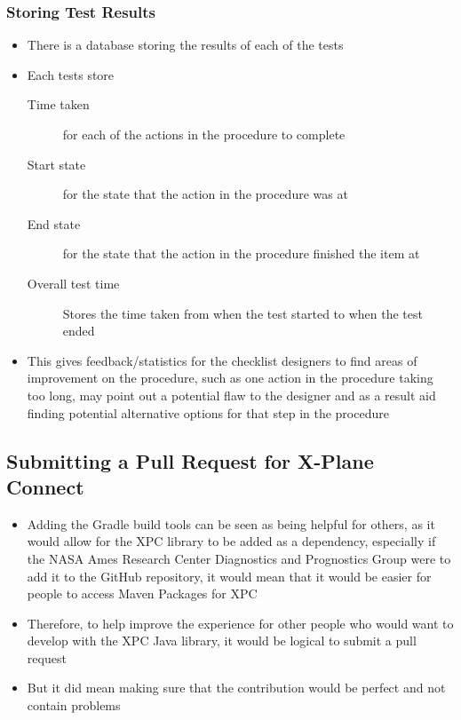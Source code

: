 \documentclass[../dissertation.tex]{subfiles}
\begin{document}
\subsubsection{Storing Test Results}
\begin{itemize}
  \item There is a database storing the results of each of the tests
  \item Each tests store
  \begin{description}
    \item[Time taken] for each of the actions in the procedure to complete
    \item[Start state] for the state that the action in the procedure was at
    \item[End state] for the state that the action in the procedure finished
      the item at
    \item[Overall test time] Stores the time taken from when the test started
      to when the test ended
  \end{description}
  \item This gives feedback/statistics for the checklist designers
    to find areas of improvement on the procedure, such as one action
    in the procedure taking too long, may point out a potential flaw
    to the designer and as a result aid finding potential alternative
    options for that step in the procedure
\end{itemize}

\subsection{Submitting a Pull Request for X-Plane Connect}
\begin{itemize}
  \item Adding the Gradle build tools can be seen as being helpful
    for others, as it would allow for the XPC library to be added
    as a dependency, especially if the NASA Ames Research Center Diagnostics and Prognostics Group
    were to add it to the GitHub repository, it would mean that it would be easier for
    people to access Maven Packages for XPC
  \item Therefore, to help improve the experience for other people who would want
    to develop with the XPC Java library, it would be logical to submit a
    pull request
  \item But it did mean making sure that the contribution would be perfect and not contain problems %
\end{itemize}
\end{document}
